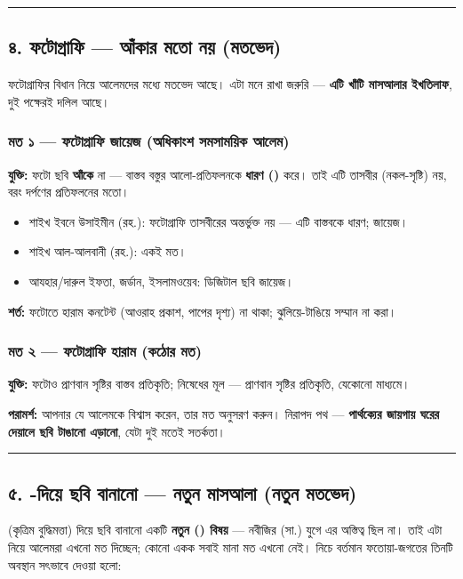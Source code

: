 \medskip\hrule\medskip

\subsection*{৪. ফটোগ্রাফি — আঁকার মতো নয় (মতভেদ)}

ফটোগ্রাফির বিধান নিয়ে আলেমদের মধ্যে মতভেদ আছে। এটা মনে রাখা জরুরি — \textbf{এটি খাঁটি মাসআলার ইখতিলাফ}, দুই পক্ষেরই দলিল আছে।

\subsubsection*{মত ১ — ফটোগ্রাফি জায়েজ (অধিকাংশ সমসাময়িক আলেম)}

\textbf{যুক্তি:} ফটো ছবি \textbf{আঁকে} না — বাস্তব বস্তুর আলো-প্রতিফলনকে \textbf{ধারণ ()} করে। তাই এটি তাসবীর (নকল-সৃষ্টি) নয়, বরং দর্পণের প্রতিফলনের মতো।

\begin{itemize}
\item শাইখ ইবনে উসাইমীন (রহ.): ফটোগ্রাফি তাসবীরের অন্তর্ভুক্ত নয় — এটি বাস্তবকে ধারণ; জায়েজ।
\item শাইখ আল-আলবানী (রহ.): একই মত।
\item আযহার/দারুল ইফতা, জর্ডান, ইসলামওয়েব: ডিজিটাল ছবি জায়েজ।
\end{itemize}
\textbf{শর্ত:} ফটোতে হারাম কনটেন্ট (আওরাহ প্রকাশ, পাপের দৃশ্য) না থাকা; ঝুলিয়ে-টাঙিয়ে সম্মান না করা।

\subsubsection*{মত ২ — ফটোগ্রাফি হারাম (কঠোর মত)}

\textbf{যুক্তি:} ফটোও প্রাণবান সৃষ্টির বাস্তব প্রতিকৃতি; নিষেধের মূল — প্রাণবান সৃষ্টির প্রতিকৃতি, যেকোনো মাধ্যমে।

\textbf{পরামর্শ:} আপনার যে আলেমকে বিশ্বাস করেন, তার মত অনুসরণ করুন। নিরাপদ পথ — \textbf{পার্থক্যের জায়গায় ঘরের দেয়ালে ছবি টাঙানো এড়ানো}, যেটা দুই মতেই সতর্কতা।

\medskip\hrule\medskip

\subsection*{৫. -দিয়ে ছবি বানানো — নতুন মাসআলা (নতুন মতভেদ)}

 (কৃত্রিম বুদ্ধিমত্তা) দিয়ে ছবি বানানো একটি \textbf{নতুন () বিষয়} — নবীজির (সা.) যুগে এর অস্তিত্ব ছিল না। তাই এটা নিয়ে আলেমরা এখনো মত দিচ্ছেন; কোনো একক সবাই মানা মত এখনো নেই। নিচে বর্তমান ফতোয়া-জগতের তিনটি অবস্থান সৎভাবে দেওয়া হলো:

